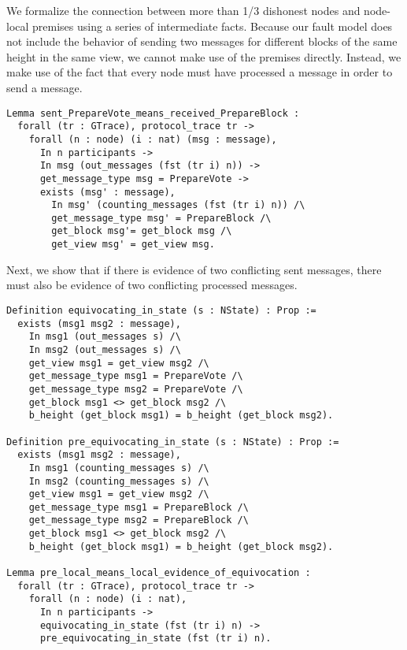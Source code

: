 \documentclass{easychair}
\begin{document}
We formalize the connection between more than 1/3 dishonest nodes and node-local premises using a series of intermediate facts. Because our fault model does not include the behavior of sending two  messages for different blocks of the same height in the same view, we cannot make use of the premises directly. Instead, we make use of the fact that every node must have processed a  message in order to send a  message. 
\begin{lstlisting}[language=Coq]
Lemma sent_PrepareVote_means_received_PrepareBlock :
  forall (tr : GTrace), protocol_trace tr ->
    forall (n : node) (i : nat) (msg : message),
      In n participants ->
      In msg (out_messages (fst (tr i) n)) ->
      get_message_type msg = PrepareVote ->
      exists (msg' : message),
        In msg' (counting_messages (fst (tr i) n)) /\
        get_message_type msg' = PrepareBlock /\
        get_block msg'= get_block msg /\
        get_view msg' = get_view msg.
\end{lstlisting}
Next, we show that if there is evidence of two conflicting sent  messages, there must also be evidence of two conflicting processed  messages.

\begin{lstlisting}[language=Coq]
Definition equivocating_in_state (s : NState) : Prop :=
  exists (msg1 msg2 : message),
    In msg1 (out_messages s) /\
    In msg2 (out_messages s) /\
    get_view msg1 = get_view msg2 /\
    get_message_type msg1 = PrepareVote /\
    get_message_type msg2 = PrepareVote /\
    get_block msg1 <> get_block msg2 /\
    b_height (get_block msg1) = b_height (get_block msg2).
    
Definition pre_equivocating_in_state (s : NState) : Prop :=
  exists (msg1 msg2 : message),
    In msg1 (counting_messages s) /\
    In msg2 (counting_messages s) /\
    get_view msg1 = get_view msg2 /\
    get_message_type msg1 = PrepareBlock /\
    get_message_type msg2 = PrepareBlock /\
    get_block msg1 <> get_block msg2 /\
    b_height (get_block msg1) = b_height (get_block msg2).
    
Lemma pre_local_means_local_evidence_of_equivocation :
  forall (tr : GTrace), protocol_trace tr ->
    forall (n : node) (i : nat),
      In n participants ->
      equivocating_in_state (fst (tr i) n) ->
      pre_equivocating_in_state (fst (tr i) n).
\end{lstlisting}
\end{document}
